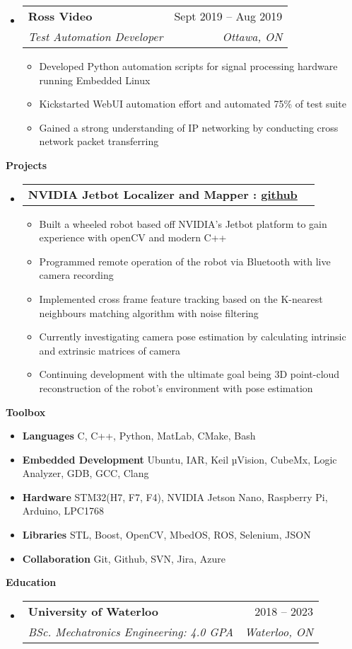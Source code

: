 \documentclass[letterpaper,12pt]{article}[leftmargin=*]
\makeatletter
\def \entryspacing {-0pt}
\renewcommand{\section}[2]{\vspace{5pt}
  \colorbox{secondary}{\color{white}\raggedbottom\normalsize\textbf{{#1}{\hspace{7pt}#2}}}
}
\newcommand{\resumeEntryStart}{\begin{itemize}[leftmargin=2.5mm]}
\newcommand{\resumeEntryEnd}{\end{itemize}\vspace{\entryspacing}}
\newcommand{\resumeItemListStart}{\begin{itemize}[leftmargin=4.5mm]}
\newcommand{\resumeItemListEnd}{\end{itemize}}
\newcommand{\resumeItem}[1]{
  \item\small{
    {#1 \vspace{-2pt}}
  }
}
\newcommand{\resumeEntryTSDL}[4]{
  \vspace{-1pt}\item[]
    \begin{tabularx}{0.97\textwidth}{X@{\hspace{60pt}}r}
      \textbf{\color{primary}#1} & {\firabook\color{accent}\small#2} \\
      \textit{\color{accent}\small#3} & \textit{\color{accent}\small#4} \\
    \end{tabularx}\vspace{-6pt}
}
\newcommand{\resumeEntryTD}[2]{
  \vspace{-1pt}\item[]
    \begin{tabularx}{0.97\textwidth}{X@{\hspace{60pt}}r}
      \textbf{\color{primary}#1} & {\firabook\color{accent}\small#2} \\
    \end{tabularx}\vspace{-6pt}
}
\newcommand{\resumeEntryS}[2]{
  \item[]\small{
    \textbf{\color{primary}#1 }{ #2 \vspace{-6pt}}
  }
}
\makeatother
\begin{document}
  \resumeEntryStart
    \resumeEntryTSDL
      {Ross Video}{Sept 2019 -- Aug 2019}
      {Test Automation Developer}{Ottawa, ON}
    \resumeItemListStart
        \resumeItem {Developed Python automation scripts for signal processing hardware running Embedded Linux}
        \resumeItem {Kickstarted WebUI automation effort and automated 75\% of test suite}
        \resumeItem {Gained a strong understanding of IP networking by conducting cross network packet transferring}
    \resumeItemListEnd
  \resumeEntryEnd

\section{\faFlask}{Projects}

  \resumeEntryStart
    \resumeEntryTD
      {NVIDIA Jetbot Localizer and Mapper : \href{https://github.com/younesr1/jetbot_slam}{github}}{}
    \resumeItemListStart
      \resumeItem {Built a wheeled robot based off NVIDIA's Jetbot platform to gain experience with openCV and modern C++}
      \resumeItem {Programmed remote operation  of the robot via Bluetooth with live camera recording}
      \resumeItem {Implemented cross frame feature tracking based on the K-nearest neighbours matching algorithm with noise filtering}
      \resumeItem {Currently investigating camera pose estimation by calculating intrinsic and extrinsic matrices of camera}
      \resumeItem {Continuing development with the ultimate goal being 3D point-cloud reconstruction of the robot's environment with pose estimation}
    \resumeItemListEnd
  \resumeEntryEnd

\section{\faGears}{Toolbox}
 \resumeEntryStart
  \resumeEntryS{Languages } {C, C++, Python, MatLab, CMake, Bash}
  \resumeEntryS{Embedded Development} {Ubuntu, IAR, Keil µVision, CubeMx, Logic Analyzer, GDB, GCC, Clang}
  \resumeEntryS{Hardware} {STM32(H7, F7, F4), NVIDIA Jetson Nano, Raspberry Pi, Arduino, LPC1768}
  \resumeEntryS{Libraries } {STL, Boost, OpenCV, MbedOS, ROS, Selenium, JSON}
  \resumeEntryS{Collaboration } {Git, Github, SVN, Jira, Azure}
 \resumeEntryEnd
\vspace{10pt}
\section{\faGraduationCap}{Education}
  \resumeEntryStart
    \resumeEntryTSDL
      {University of Waterloo}{2018 -- 2023}
      {BSc. Mechatronics Engineering: 4.0 GPA}{Waterloo, ON}
  \resumeEntryEnd
\end{document}
